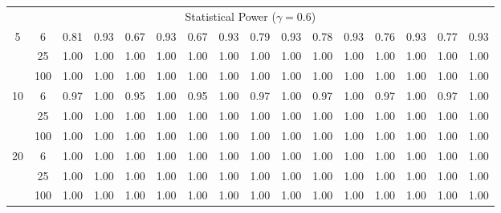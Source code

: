 \documentclass[
  man]{apa6}
\newenvironment{lltable}{\begin{landscape}\centering\begin{ThreePartTable}}{\end{ThreePartTable}\end{landscape}}
\begin{document}
\begin{lltable}
{\begin{longtable}{cccccccccccccccc}
\multicolumn{16}{c}{Statistical Power ($\gamma = 0.6$)}\\
5 & 6 & 0.81 & 0.93 & 0.67 & 0.93 & 0.67 & 0.93 & 0.79 & 0.93 & 0.78 & 0.93 & 0.76 & 0.93 & 0.77 & 0.93\\
 & 25 & 1.00 & 1.00 & 1.00 & 1.00 & 1.00 & 1.00 & 1.00 & 1.00 & 1.00 & 1.00 & 1.00 & 1.00 & 1.00 & 1.00\\
 & 100 & 1.00 & 1.00 & 1.00 & 1.00 & 1.00 & 1.00 & 1.00 & 1.00 & 1.00 & 1.00 & 1.00 & 1.00 & 1.00 & 1.00\\
10 & 6 & 0.97 & 1.00 & 0.95 & 1.00 & 0.95 & 1.00 & 0.97 & 1.00 & 0.97 & 1.00 & 0.97 & 1.00 & 0.97 & 1.00\\
 & 25 & 1.00 & 1.00 & 1.00 & 1.00 & 1.00 & 1.00 & 1.00 & 1.00 & 1.00 & 1.00 & 1.00 & 1.00 & 1.00 & 1.00\\
 & 100 & 1.00 & 1.00 & 1.00 & 1.00 & 1.00 & 1.00 & 1.00 & 1.00 & 1.00 & 1.00 & 1.00 & 1.00 & 1.00 & 1.00\\
20 & 6 & 1.00 & 1.00 & 1.00 & 1.00 & 1.00 & 1.00 & 1.00 & 1.00 & 1.00 & 1.00 & 1.00 & 1.00 & 1.00 & 1.00\\
 & 25 & 1.00 & 1.00 & 1.00 & 1.00 & 1.00 & 1.00 & 1.00 & 1.00 & 1.00 & 1.00 & 1.00 & 1.00 & 1.00 & 1.00\\
 & 100 & 1.00 & 1.00 & 1.00 & 1.00 & 1.00 & 1.00 & 1.00 & 1.00 & 1.00 & 1.00 & 1.00 & 1.00 & 1.00 & 1.00\\
\bottomrule
\end{longtable}

}

\end{lltable}
\end{document}
